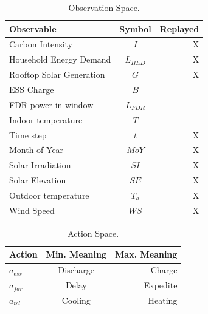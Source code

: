 \begin{table}
\caption{Observation Space.}
\label{tab:observation_space}
\vskip 0.15in
\begin{center}
\begin{small}
\begin{sc}
\begin{tabular}{lcr}
\toprule
Observable & Symbol & Replayed\\
\midrule
Carbon Intensity & $I$ & X\\
    Household Energy Demand & $L_{HED}$ & X\\
    Rooftop Solar Generation & $G$ & X\\
    ESS Charge & $B$ & \\
    FDR power in window & $L_{FDR}$ &\\
    Indoor temperature & $T$ & \\
    Time step & $t$ & X\\
    Month of Year & $MoY$ & X \\
    Solar Irradiation & $SI$ & X\\
    Solar Elevation & $SE$ & X\\
    Outdoor temperature & $T_a$ & X \\
    Wind Speed & $WS$ & X\\
\bottomrule
\end{tabular}
\end{sc}
\end{small}
\end{center}
\vskip -0.1in
\end{table}

\begin{table}
\caption{Action Space.}
\label{tab:action_space}
\vskip 0.15in
\begin{center}
\begin{small}
\begin{sc}
\begin{tabular}{lcr}
\toprule
Action & Min. Meaning & Max. Meaning\\
\midrule
$a_{ess}$ & Discharge & Charge \\ 
    $a_{fdr}$ & Delay     & Expedite \\
    $a_{tcl}$ & Cooling   & Heating\\
\bottomrule
\end{tabular}
\end{sc}
\end{small}
\end{center}
\vskip -0.1in
\end{table}

